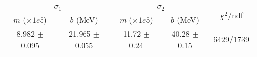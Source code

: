 \begin{tabular}{cc|cc||c}
\multicolumn{2}{c|}{$\sigma_1$} & \multicolumn{2}{|c}{$\sigma_2$} & \multirow{2}{*}{$\chi^2/$ndf} \\
$m$ ($\times1e5$) & $b$ (MeV) & $m$ ($\times1e5$) & $b$ (MeV) & \\
\hline
8.982 $\pm$ 0.095 & 21.965 $\pm$ 0.055 & 11.72 $\pm$ 0.24 & 40.28 $\pm$ 0.15 & 6429/1739\\
\end{tabular}
